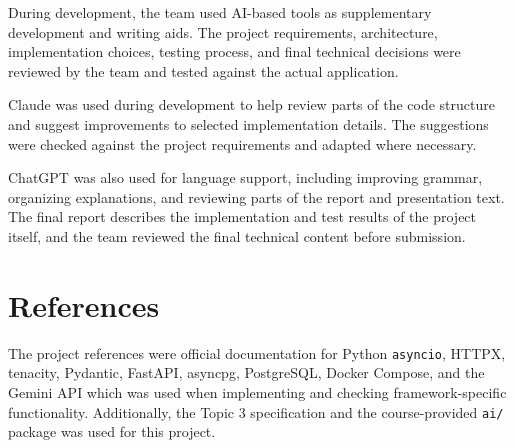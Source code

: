 \documentclass[11pt,a4paper]{article}
\begin{document}
During development, the team used AI-based tools as supplementary development and writing aids. The project requirements, architecture, implementation choices, testing process, and final technical decisions were reviewed by the team and tested against the actual application.

Claude was used during development to help review parts of the code structure and suggest improvements to selected implementation details. The suggestions were checked against the project requirements and adapted where necessary.

ChatGPT was also used for language support, including improving grammar, organizing explanations, and reviewing parts of the report and presentation text. The final report describes the implementation and test results of the project itself, and the team reviewed the final technical content before submission.

\section*{References}

The project references were official documentation for Python \texttt{asyncio}, HTTPX, tenacity, Pydantic, FastAPI, asyncpg, PostgreSQL, Docker Compose, and the Gemini API which was used when implementing and checking framework-specific functionality. Additionally, the Topic 3 specification and the course-provided \texttt{ai/} package was used for this project. 
\end{document}
